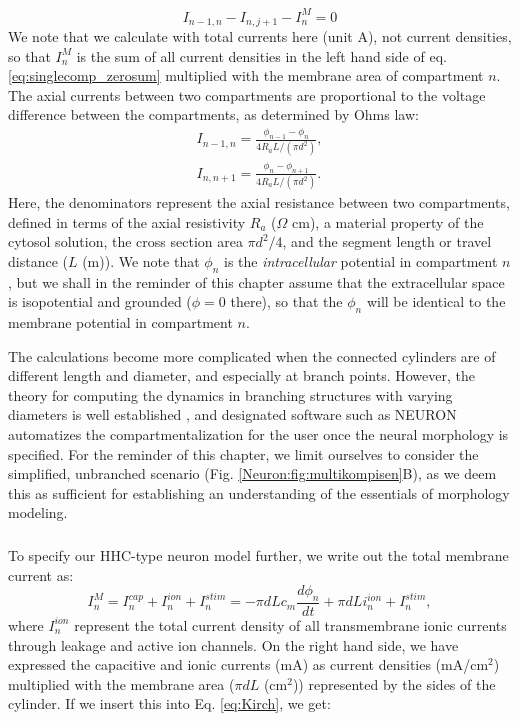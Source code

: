 \begin{equation}
I_{n-1,n} - I_{n,j+1} - I^M_n = 0
\label{eq:Kirch}
\end{equation}
We note that we calculate with total currents here (unit A), not current densities, so that $I^M_n$ is the sum of all current densities in the left hand side of eq. \ref{eq:singlecomp_zerosum} multiplied with the membrane area of compartment $n$. The axial currents between two compartments are proportional to the voltage difference between the compartments, as determined by Ohms law:
\begin{eqnarray}
I_{n-1,n} = \frac{\phi_{n-1}-\phi_n}{4 R_a L/(\pi d^2)}, \nonumber \\ 
I_{n,n+1} = \frac{\phi_{n}-\phi_{n+1}}{4 R_a L/(\pi d^2)}.
\label{eq:axialcurrents}
\end{eqnarray}
Here, the denominators represent the axial resistance between two compartments, defined in terms of the axial resistivity $R_a$ ($\Omega$ cm), a material property of the cytosol solution, the cross section area $\pi d^2/4$, and the segment length or travel distance ($L$ (m)). We note that $\phi_n$ is the \emph{intracellular} potential in compartment $n$, but we shall in the reminder of this chapter assume that the extracellular space is isopotential and grounded ($\phi = 0$ there), so that the $\phi_n$ will be identical to the membrane potential in compartment $n$.

The calculations become more complicated when the connected cylinders are of different length and diameter, and especially at branch points. However, the theory for computing the dynamics in branching structures with varying diameters is well established \cite{Rall1977,Rall1989}, and designated software such as NEURON \cite{Hines1997, Hines2009} automatizes the compartmentalization for the user once the neural morphology is specified. For the reminder of this chapter, we limit ourselves to consider the simplified, unbranched scenario (Fig. \ref{Neuron:fig:multikompisen}B), as we deem this as sufficient for establishing an understanding of the essentials of morphology modeling. 




\subsubsection{}
\label{sec:Active_multicomp}
To specify our HHC-type neuron model further, we write out the total membrane current as:
\begin{equation}
I^M_n = I_n^{cap} + I_n^{ion} + I_n^{stim} = -\pi d L c_m \frac{d\phi_n}{dt} + \pi d L i_n^{ion} + I_n^{stim}, 
\label{eq:Imemb}
\end{equation}
where $I_n^{ion}$ represent the total current density of all transmembrane ionic currents through leakage and active ion channels. On the right hand side, we have expressed the capacitive and ionic currents (mA) as current densities (mA/cm$^2$) multiplied with the membrane area ($\pi d L$ (cm$^2$)) represented by the sides of the cylinder. If we insert this into Eq. \ref{eq:Kirch}, we get:

